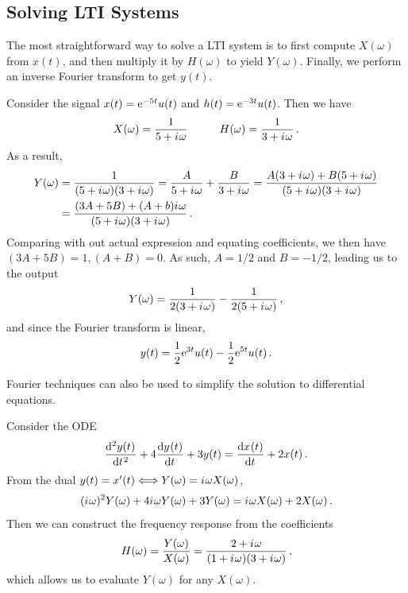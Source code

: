 \subsection{Solving LTI Systems}
%
The most straightforward way to solve a LTI system is to first compute
$X(\omega)$ from $x(t)$, and then multiply it by $H(\omega)$ to yield
$Y(\omega)$. Finally, we perform an inverse Fourier transform to get
$y(t)$.
%
\begin{exmp}
  Consider the signal $x(t) = \mathrm{e}^{-5t}u(t)$ and $h(t) = \mathrm{e}^{-3t}u(t)$.
  Then we have
  \begin{displaymath}
    X(\omega) = \frac{1}{5 + \im\omega} \hspace{10mm}
    H(\omega) = \frac{1}{3 + \im\omega} \,.
  \end{displaymath}
  As a result,
  \begin{align*}
    Y(\omega) &= \frac{1}{(5 + {i\mkern1mu}\omega)(3 + {i\mkern1mu}\omega)}
    = \frac{A}{5 + {i\mkern1mu}\omega} + \frac{B}{3 + {i\mkern1mu}\omega}
    = \frac{A(3+{i\mkern1mu}\omega) + B(5+{i\mkern1mu}\omega)}{(5+{i\mkern1mu}\omega)(3+{i\mkern1mu}\omega)} \\
    &= \frac{(3A + 5B) + (A+b){i\mkern1mu}\omega}{(5+{i\mkern1mu}\omega)(3+{i\mkern1mu}\omega)} \,.
  \end{align*}
  Comparing with out actual expression and equating coefficients, we then
  have $(3A + 5B) = 1, (A + B) = 0$. As such, $A=1/2$ and $B=-1/2$, leading
  us to the output
  \begin{displaymath}
    Y(\omega) = \frac{1}{2(3+{i\mkern1mu}\omega)} - \frac{1}{2(5+{i\mkern1mu}\omega)} \,,
  \end{displaymath}
  and since the Fourier transform is linear,
  \begin{displaymath}
    y(t) = \frac{1}{2}\mathrm{e}^{3t}u(t) - \frac{1}{2}\mathrm{e}^{5t}u(t) \,.
  \end{displaymath}
\end{exmp}
%
Fourier techniques can also be used to simplify the solution to differential
equations.
%
\begin{exmp}
  Consider the ODE
  \begin{displaymath}
    \frac{\mathrm{d}^2{y}(t)\mkern1mu}{\mathrm{d}t\mkern1mu^2} + 4\frac{\mathrm{d}y\mkern1mu(t)}{\mathrm{d}t\mkern1mu} + 3y(t)
    = \frac{\mathrm{d}x\mkern1mu(t)}{\mathrm{d}t\mkern1mu} + 2x(t) \,.
  \end{displaymath}
  From the dual $y(t) = x^\prime(t) \Longleftrightarrow Y(\omega) = {i\mkern1mu}\omega X(\omega)$,
  \begin{displaymath}
    ({i\mkern1mu}\omega)^2 Y(\omega) + 4{i\mkern1mu}\omega Y(\omega) + 3Y(\omega)
    = {i\mkern1mu}\omega X(\omega) + 2X(\omega) \,.
  \end{displaymath}
  Then we can construct the frequency response from the coefficients
  \begin{displaymath}
    H(\omega) = \frac{Y(\omega)}{X(\omega)}
    = \frac{2 + {i\mkern1mu}\omega}{(1+{i\mkern1mu}\omega)(3+{i\mkern1mu}\omega)} \,,
  \end{displaymath}
  which allows us to evaluate $Y(\omega)$ for any $X(\omega)$.
\end{exmp}
